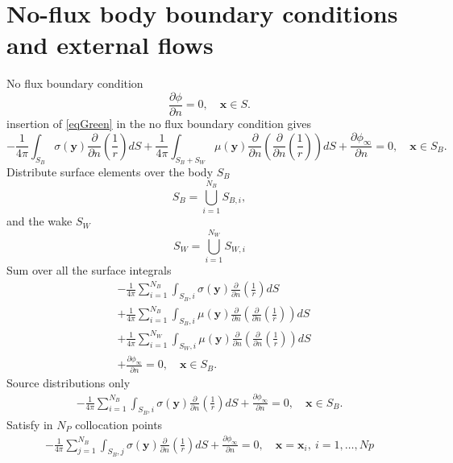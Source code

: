 \documentclass[]{book}
\newcommand{\V}[1]{\boldsymbol{#1}}
\newcommand{\nn}{\nonumber}
\begin{document}
\section{No-flux body boundary conditions and external flows}
No flux boundary condition
\begin{equation}
\frac{\partial \phi}{\partial n} = 0, \quad \V{x} \in S.
\end{equation}
insertion of \ref{eqGreen} in the no flux boundary condition gives
\begin{equation}
 	- \frac{1}{4 \pi}  \int_{S_B} \sigma (\V{y}) \frac{\partial }{\partial n}\left(\frac{1}{r} \right) dS
+ \frac{1}{4 \pi} \int_{S_B + S_W} \mu(\V{y}) \frac{\partial }{\partial n} \left(  \frac{\partial }{\partial n} \left( \frac{1}{r}\right) \right) dS	
+ \frac{\partial \phi_{\infty} }{\partial n} = 0, \quad \V{x} \in S_B.
\end{equation}
Distribute surface elements over the body $S_B$
\begin{equation}
S_B = \bigcup_{i=1}^{N_{B}} S_{B,i},
\end{equation}
and the wake $S_W$
\begin{equation}
S_W = \bigcup_{i=1}^{N_{W}} S_{W,i}
\end{equation}
Sum over all the surface integrals
\begin{align}
&- \frac{1}{4 \pi} \sum_{i=1}^{N_B}  \int_{S_B,i} \sigma (\V{y}) \frac{\partial }{\partial n}\left(\frac{1}{r} \right) dS \nn \\
&+ \frac{1}{4 \pi} \sum_{i=1}^{N_B}\int_{S_B,i} \mu(\V{y}) \frac{\partial }{\partial n} \left(  \frac{\partial }{\partial n} \left( \frac{1}{r}\right) \right) dS \nn \\
&+ \frac{1}{4 \pi} \sum_{i=1}^{N_W}\int_{S_W,i} \mu(\V{y}) \frac{\partial }{\partial n} \left(  \frac{\partial }{\partial n} \left( \frac{1}{r}\right) \right) dS \nn	\\
&+ \frac{\partial \phi_{\infty} }{\partial n} = 0, \quad \V{x} \in S_B.
\end{align}
Source distributions only
\begin{align}
- \frac{1}{4 \pi} \sum_{i=1}^{N_B}  \int_{S_B,i} \sigma (\V{y}) \frac{\partial }{\partial n}\left(\frac{1}{r} \right) dS \nn + \frac{\partial \phi_{\infty} }{\partial n} = 0, \quad \V{x} \in S_B.
\end{align}
Satisfy in $N_P$ collocation points
\begin{align}
- \frac{1}{4 \pi} \sum_{j=1}^{N_B}  \int_{S_B,j} \sigma (\V{y}) \frac{\partial }{\partial n}\left(\frac{1}{r} \right) dS \nn + \frac{\partial \phi_{\infty} }{\partial n} = 0, \quad \V{x}= \V{x}_i,  ~i=1,\ldots,Np
\end{align}
	
\end{document}
